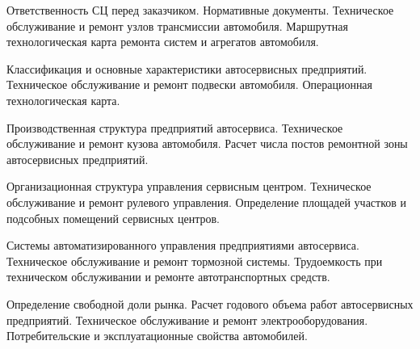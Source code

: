 \documentclass[
	11pt,
	a4paper,
	]
	{article}
\begin{document}
\bigskip

\noindent{} 
	{
		Ответственность СЦ перед заказчиком. Нормативные документы.
	}{
		Техническое обслуживание и ремонт узлов трансмиссии автомобиля.
	}{
		Маршрутная технологическая карта ремонта систем и агрегатов автомобиля.
	}

\bigskip

\noindent{} 
	{
		Классификация и основные характеристики автосервисных предприятий.
	}{
		Техническое обслуживание и ремонт подвески автомобиля.
	}{
		Операционная технологическая карта.
	}

\bigskip

\noindent{} 
	{
		Производственная структура предприятий автосервиса.
	}{
		Техническое обслуживание и ремонт кузова автомобиля.
	}{
		Расчет числа постов ремонтной зоны автосервисных предприятий.
	}

\bigskip

\noindent{} 
	{
		Организационная структура управления сервисным центром.
	}{
		Техническое обслуживание и ремонт рулевого управления.
	}{
		Определение площадей участков и подсобных помещений сервисных центров.
	}

\bigskip

\noindent{} 
	{
		Системы автоматизированного управления предприятиями автосервиса.
	}{
		Техническое обслуживание и ремонт тормозной системы.
	}{
		Трудоемкость при техническом обслуживании и ремонте автотранспортных средств.
	}

\bigskip

\noindent{} 
	{
		Определение свободной доли рынка. Расчет годового объема работ автосервисных предприятий.
	}{
		Техническое обслуживание и ремонт электрооборудования.
	}{
		Потребительские и эксплуатационные свойства автомобилей.
	}

\bigskip
\end{document}
